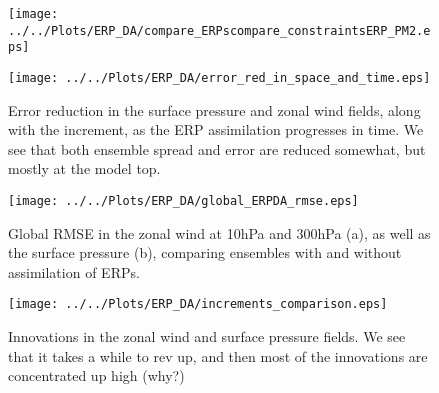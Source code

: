 \documentclass[jgrga]{agutex}
\begin{document}
 \begin{figure}
\texttt{[image: ../../Plots/ERP\_DA/compare\_ERPscompare\_constraintsERP\_PM2.eps]} 
 \label{fig:fit_to_PM2}
\end{figure}






 \begin{figure}
\texttt{[image: ../../Plots/ERP\_DA/error\_red\_in\_space\_and\_time.eps]} \\
 \caption{Error reduction in the surface pressure and zonal wind fields, along with the increment, as the ERP assimilation progresses in time.  We see that both ensemble spread and error are reduced somewhat, but mostly at the model top.}
 \label{fig:ERPDA}
\end{figure}

 \begin{figure}
\texttt{[image: ../../Plots/ERP\_DA/global\_ERPDA\_rmse.eps]} \\
 \caption{Global RMSE in the zonal wind at 10hPa and 300hPa (a), as well as the surface pressure (b), comparing ensembles with and without assimilation of ERPs.}
 \label{fig:global1}
\end{figure}



 \begin{figure}
\texttt{[image: ../../Plots/ERP\_DA/increments\_comparison.eps]} \\
 \caption{Innovations in the zonal wind and surface pressure fields.  We see that it takes a while to rev up, and then most of the innovations are concentrated up high (why?)}
 \label{fig:innovations}
\end{figure}

\end{document}
